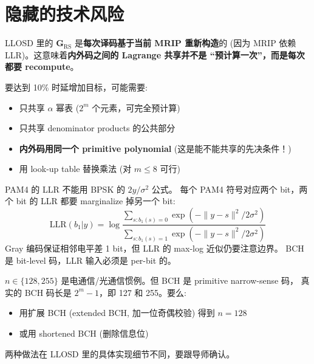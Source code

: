 \documentclass[11pt,a4paper]{article}
\begin{document}
\section{隐藏的技术风险}

\begin{riskbox}[title=\textbf{Lagrange 共享的可行性风险}]
LLOSD 里的 $\mathbf{G}_{\text{RS}}$ 是\textbf{每次译码基于当前 MRIP 重新构造}的
(因为 MRIP 依赖 LLR)。这意味着\textbf{内外码之间的 Lagrange 共享并不是
``预计算一次''，而是每次都要 recompute}。

要达到 10\% 时延增加目标，可能需要:
\begin{itemize}[leftmargin=1em, itemsep=1pt, topsep=2pt]
\item 只共享 $\alpha$ 幂表 ($2^m$ 个元素，可完全预计算)
\item 只共享 denominator products 的公共部分
\item \textbf{内外码用同一个 primitive polynomial}
  (这是能不能共享的先决条件！)
\item 用 look-up table 替换乘法 (对 $m \leq 8$ 可行)
\end{itemize}
\end{riskbox}

\begin{riskbox}[title=\textbf{PAM4 LLR 的正确性风险}]
PAM4 的 LLR 不能用 BPSK 的 $2y/\sigma^2$ 公式。
每个 PAM4 符号对应两个 bit，两个 bit 的 LLR 都要 marginalize 掉另一个 bit:
\[
\text{LLR}(b_1 | y) = \log \frac{\sum_{s: b_1(s)=0} \exp(-\|y - s\|^2 / 2\sigma^2)}
                                {\sum_{s: b_1(s)=1} \exp(-\|y - s\|^2 / 2\sigma^2)}
\]
Gray 编码保证相邻电平差 1 bit，但 LLR 的 max-log 近似仍要注意边界。
BCH 是 bit-level 码，LLR 输入必须是 per-bit 的。
\end{riskbox}

\begin{riskbox}[title=\textbf{参数选择的风险}]
$n \in \{128, 255\}$ 是电通信/光通信惯例。但 BCH 是 primitive narrow-sense 码，
真实的 BCH 码长是 $2^m - 1$，即 127 和 255。要么:
\begin{itemize}[leftmargin=1em, itemsep=1pt, topsep=2pt]
\item 用扩展 BCH (extended BCH, 加一位奇偶校验) 得到 $n=128$
\item 或用 shortened BCH (删除信息位)
\end{itemize}
两种做法在 LLOSD 里的具体实现细节不同，要跟导师确认。
\end{riskbox}

\end{document}
